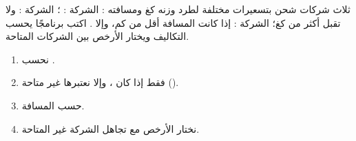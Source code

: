 \begin{statement}
ثلاث شركات شحن بتسعيرات مختلفة لطرد وزنه  كغ ومسافته : الشركة : ؛ الشركة :  ولا تقبل أكثر من  كغ؛ الشركة :  إذا كانت المسافة أقل من  كم، وإلا . اكتب برنامجًا يحسب التكاليف ويختار الأرخص بين الشركات المتاحة.
\end{statement}
\begin{stepsbox}\begin{enumerate}
\item نحسب .
\item {} فقط إذا كان ، وإلا نعتبرها غير متاحة ().
\item {} حسب المسافة.
\item نختار الأرخص مع تجاهل الشركة غير المتاحة.
\end{enumerate}\end{stepsbox}
